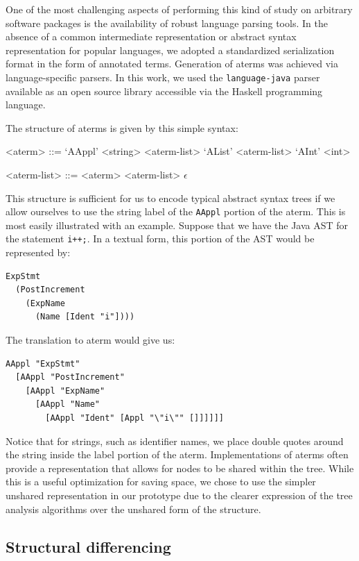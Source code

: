 One of the most challenging aspects of performing this kind of study on
arbitrary software packages is the availability of robust language parsing
tools.  In the absence of a common intermediate representation or abstract
syntax representation for popular languages, we adopted a standardized
serialization format in the form of annotated terms.  Generation of aterms was
achieved via language-specific parsers.  In this work, we used the
{\tt language-java} parser available as an open source library accessible via the
Haskell programming language.

The structure of aterms is given by this simple syntax:
\setlength{\grammarindent}{8em}
\begin{grammar}
<aterm> ::= `AAppl' <string> <aterm-list>
\alt `AList' <aterm-list>
\alt `AInt' <int>

<aterm-list> ::= <aterm> <aterm-list>
\alt $\epsilon$
\end{grammar}

This structure is sufficient for us to encode typical abstract syntax trees if
we allow ourselves to use the string label of the {\tt AAppl} portion of the
aterm. This is most easily illustrated with an example.  Suppose that we have
the Java AST for the statement {\tt i++;}.  In a textual form, this portion of
the AST would be represented by:

\begin{verbatim}
ExpStmt
  (PostIncrement
    (ExpName
      (Name [Ident "i"])))
\end{verbatim}

The translation to aterm would give us:

\begin{verbatim}
AAppl "ExpStmt"
  [AAppl "PostIncrement"
    [AAppl "ExpName"
      [AAppl "Name"
        [AAppl "Ident" [Appl "\"i\"" []]]]]]
\end{verbatim}

Notice that for strings, such as identifier names, we place double quotes
around the string inside the label portion of the aterm. Implementations of
aterms often provide a representation that allows for nodes to be shared
within the tree. While this is a useful optimization for saving space, we
chose to use the simpler unshared representation in our prototype due to the
clearer expression of the tree analysis algorithms over the unshared form of
the structure.

\subsection{Structural differencing}

